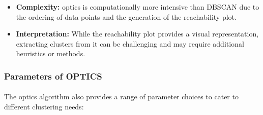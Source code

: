         \begin{itemize}
            \item \textbf{Complexity:} \acrshort{optics} is computationally more intensive than DBSCAN due to the ordering of data points and the generation of the reachability plot.
            
            \item \textbf{Interpretation:} While the reachability plot provides a visual representation, extracting clusters from it can be challenging and may require additional heuristics or methods.
        \end{itemize}
        
        \subsubsection{Parameters of OPTICS}
        
            \paragraph{}The \acrshort{optics} algorithm also provides a range of parameter choices to cater to different clustering needs:

